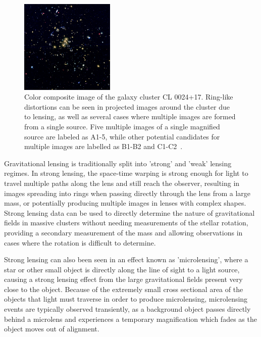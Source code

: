 \begin{figure}
	\label{fig:gravLensing}
	\centering
	\includegraphics[width=0.4\textwidth]{figures/grav_lensing.jpg}
	\caption[Gravitational lensing of galaxy cluster CL0024+17]{ Color composite image of the galaxy cluster CL 0024+17. Ring-like distortions can be seen in projected images around the cluster due to lensing, as well as several cases where multiple images are formed from a single source. Five multiple images of a single magnified source are labeled as A1-5, while other potential candidates for multiple images are labelled as B1-B2 and C1-C2~\cite{jee2007}.}
\end{figure}

Gravitational lensing is traditionally split into 'strong' and 'weak' lensing regimes. 
In strong lensing, the space-time warping is strong enough for light to travel multiple paths along the lens and still reach the observer, resulting in images spreading into rings when passing directly through the lens from a large mass, or potentially producing multiple images in lenses with complex shapes.
Strong lensing data can be used to directly determine the nature of gravitational fields in massive clusters without needing measurements of the stellar rotation, providing a secondary measurement of the mass and allowing observations in cases where the rotation is difficult to determine.

Strong lensing can also been seen in an effect known as 'microlensing', where a star or other small object is directly along the line of sight to a light source, causing a strong lensing effect from the large gravitational fields present very close to the object.
Because of the extremely small cross sectional area of the objects that light must traverse in order to produce microlensing, microlensing events are typically observed transiently, as a background object passes directly behind a microlens and experiences a temporary magnification which fades as the object moves out of alignment. 

